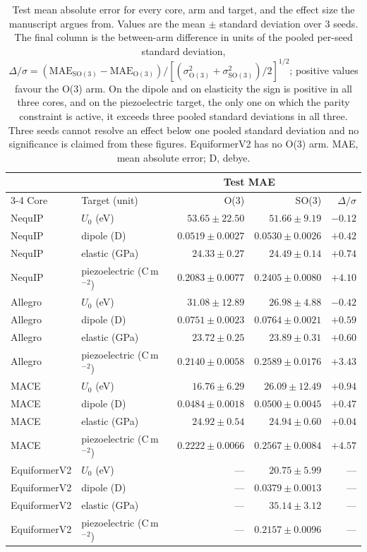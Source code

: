 \begin{table}[htbp]
\centering
\caption{Test mean absolute error for every core, arm and target, and the effect size the manuscript argues from. Values are the mean $\pm$ standard deviation over 3 seeds. The final column is the between-arm difference in units of the pooled per-seed standard deviation, $\Delta/\sigma = (\mathrm{MAE_{SO(3)}} - \mathrm{MAE_{O(3)}})/[(\sigma_{\mathrm{O(3)}}^2+\sigma_{\mathrm{SO(3)}}^2)/2]^{1/2}$; positive values favour the O(3) arm. On the dipole and on elasticity the sign is positive in all three cores, and on the piezoelectric target, the only one on which the parity constraint is active, it exceeds three pooled standard deviations in all three. Three seeds cannot resolve an effect below one pooled standard deviation and no significance is claimed from these figures. EquiformerV2 has no O(3) arm. MAE, mean absolute error; D, debye.}
\label{stab:accuracy}
\fontsize{7bp}{8.5bp}\selectfont
\begin{tabular}{@{}l l r r r@{}}
\toprule
 & & \multicolumn{2}{c}{Test MAE} & \\
\cmidrule(lr){3-4}
Core & Target (unit) & O(3) & SO(3) & $\Delta/\sigma$ \\
\midrule
NequIP & $U_0$ (eV) & $53.65 \pm 22.50$ & $51.66 \pm 9.19$ & $-0.12$ \\
NequIP & dipole (D) & $0.0519 \pm 0.0027$ & $0.0530 \pm 0.0026$ & $+0.42$ \\
NequIP & elastic (GPa) & $24.33 \pm 0.27$ & $24.49 \pm 0.14$ & $+0.74$ \\
NequIP & piezoelectric (C\,m$^{-2}$) & $0.2083 \pm 0.0077$ & $0.2405 \pm 0.0080$ & $+4.10$ \\
Allegro & $U_0$ (eV) & $31.08 \pm 12.89$ & $26.98 \pm 4.88$ & $-0.42$ \\
Allegro & dipole (D) & $0.0751 \pm 0.0023$ & $0.0764 \pm 0.0021$ & $+0.59$ \\
Allegro & elastic (GPa) & $23.72 \pm 0.25$ & $23.89 \pm 0.31$ & $+0.60$ \\
Allegro & piezoelectric (C\,m$^{-2}$) & $0.2140 \pm 0.0058$ & $0.2589 \pm 0.0176$ & $+3.43$ \\
MACE & $U_0$ (eV) & $16.76 \pm 6.29$ & $26.09 \pm 12.49$ & $+0.94$ \\
MACE & dipole (D) & $0.0484 \pm 0.0018$ & $0.0500 \pm 0.0045$ & $+0.47$ \\
MACE & elastic (GPa) & $24.92 \pm 0.54$ & $24.94 \pm 0.60$ & $+0.04$ \\
MACE & piezoelectric (C\,m$^{-2}$) & $0.2222 \pm 0.0066$ & $0.2567 \pm 0.0084$ & $+4.57$ \\
EquiformerV2 & $U_0$ (eV) & --- & $20.75 \pm 5.99$ & --- \\
EquiformerV2 & dipole (D) & --- & $0.0379 \pm 0.0013$ & --- \\
EquiformerV2 & elastic (GPa) & --- & $35.14 \pm 3.12$ & --- \\
EquiformerV2 & piezoelectric (C\,m$^{-2}$) & --- & $0.2157 \pm 0.0096$ & --- \\
\bottomrule
\end{tabular}
\end{table}


